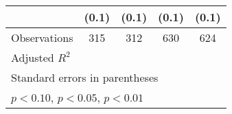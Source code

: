 \begin{table}[htbp]
\begin{tabular}{l*{4}{c}}
                &    (0.1)         &    (0.1)         &    (0.1)         &    (0.1)         \\
\hline
Observations    &      315         &      312         &      630         &      624         \\
Adjusted \(R^{2}\)&                  &                  &                  &                  \\
\hline\hline
\multicolumn{5}{l}{\footnotesize Standard errors in parentheses}\\
\multicolumn{5}{l}{\footnotesize \sym{*} \(p<0.10\), \sym{**} \(p<0.05\), \sym{***} \(p<0.01\)}\\
\end{tabular}
\end{table}
